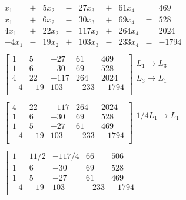 \documentclass[]{article}
\begin{document}
\[
\begin{array}{rrrrrrrrr}
x_{1} & + & 5 x_{2} & - & 27 x_{3} & + & 61 x_{4} & = & 469 \\ 
x_{1} & + & 6 x_{2} & - & 30 x_{3} & + & 69 x_{4} & = & 528 \\ 
4 x_{1} & + & 22 x_{2} & - & 117 x_{3} & + & 264 x_{4} & = & 2024 \\ 
-4 x_{1} & - & 19 x_{2} & + & 103 x_{3} & - & 233 x_{4} & = & -1794 \\ 
\end{array}
\]\[
\begin{array}{l}
\left[
\begin{array}{rrrr|r}
1 & 5 & -27 & 61 & 469 \\ 
1 & 6 & -30 & 69 & 528 \\ 
4 & 22 & -117 & 264 & 2024 \\ 
-4 & -19 & 103 & -233 & -1794 \\ 
\end{array}
\right]\begin{array}{l}
L_{1} \rightarrow L_{3}\\ 
\\ 
L_{3} \rightarrow L_{1}\\ 
\\ 
\end{array}\\
 \\
\left[
\begin{array}{rrrr|r}
4 & 22 & -117 & 264 & 2024 \\ 
1 & 6 & -30 & 69 & 528 \\ 
1 & 5 & -27 & 61 & 469 \\ 
-4 & -19 & 103 & -233 & -1794 \\ 
\end{array}
\right]\begin{array}{l}
1/4 L_{1} \rightarrow L_{1}\\ 
\\ 
\\ 
\\ 
\end{array}\\
 \\
\left[
\begin{array}{rrrr|r}
1 & 11/2 & -117/4 & 66 & 506 \\ 
1 & 6 & -30 & 69 & 528 \\ 
1 & 5 & -27 & 61 & 469 \\ 
-4 & -19 & 103 & -233 & -1794 \\ 
\end{array}

\end{array}\]
\end{document}
